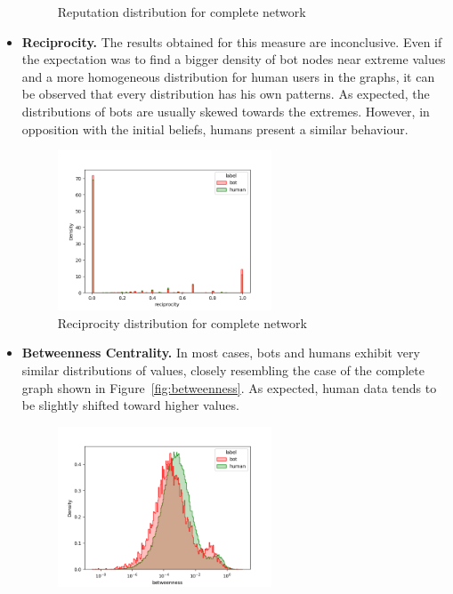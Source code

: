 \documentclass[12pt, a4paper]{article}
\begin{document}
\begin{itemize}
\begin{figure}[H]
                    \caption{Reputation distribution for complete network}
                \end{figure}
			\item \textbf{Reciprocity.} The results obtained for this measure are inconclusive. Even if the expectation was to find a bigger density of bot nodes near extreme values and a more homogeneous distribution for human users in the graphs, it can be observed that every distribution has his own patterns. As expected, the distributions of bots are usually skewed towards the extremes. However, in opposition with the initial beliefs, humans present a similar behaviour.
				\begin{figure}[H]
                	\centering
                    \includegraphics[width=0.6\textwidth]{complete_reciprocity_distribution.png}
                    \caption{Reciprocity distribution for complete network}
                \end{figure}
			\item \textbf{Betweenness Centrality.} In most cases, bots and humans exhibit very similar distributions of values, closely resembling the case of the complete graph shown in Figure~\ref{fig:betweenness}. As expected, human data tends to be slightly shifted toward higher values.
                \begin{figure}[H]
                    \centering
                    \includegraphics[width=0.6\textwidth]{complete_betweenness_distribution.png}

\end{figure}
\end{itemize}
\end{document}
